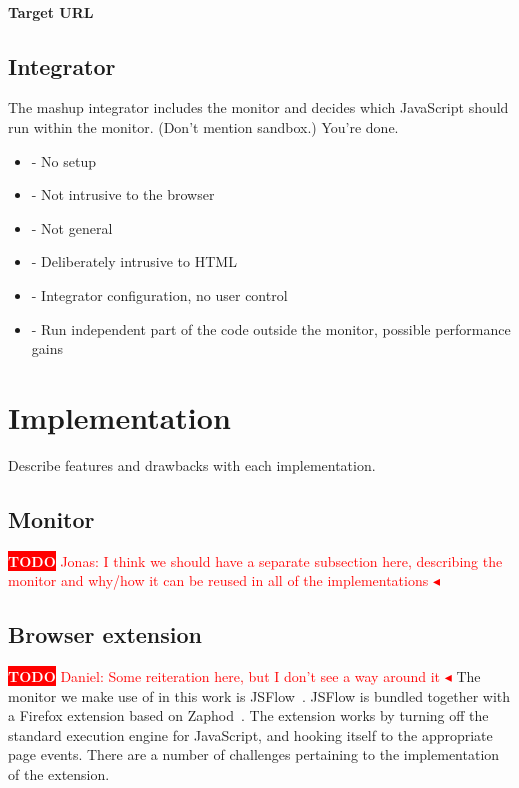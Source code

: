 \documentclass{llncs}
\newcommand{\todo}[1]{\colorbox{red}{\textcolor{white}{\sffamily\bfseries\scriptsize TODO}} \textcolor{red}{#1} \textcolor{red}{$\blacktriangleleft$}}
\begin{document}
\paragraph{Target URL}

\subsection{Integrator}

The mashup integrator includes the monitor and decides which JavaScript should 
run within the monitor. (Don't mention sandbox.) You're done.
\begin{itemize}
\item- No setup
\item- Not intrusive to the browser
\item- Not general
\item- Deliberately intrusive to HTML
\item- Integrator configuration, no user control
\item- Run independent part of the code outside the monitor, possible performance gains
\end{itemize}


\section{Implementation}
\label{sec:impl}

Describe features and drawbacks with each implementation.

\subsection{Monitor}
\todo{Jonas: I think we should have a separate subsection here, describing the monitor and why/how it can be reused in all of the implementations}


\subsection{Browser extension}
%
\todo{Daniel: Some reiteration here, but I don't see a way around it} The
monitor we make use of in this work is JSFlow~\cite{JSFLow}. JSFlow is bundled
together with a Firefox extension based on Zaphod~\cite{Zaphod}. The extension
works by turning off the standard execution engine for JavaScript, and hooking
itself to the appropriate page events. There are a number of challenges
pertaining to the implementation of the extension.
\end{document}
